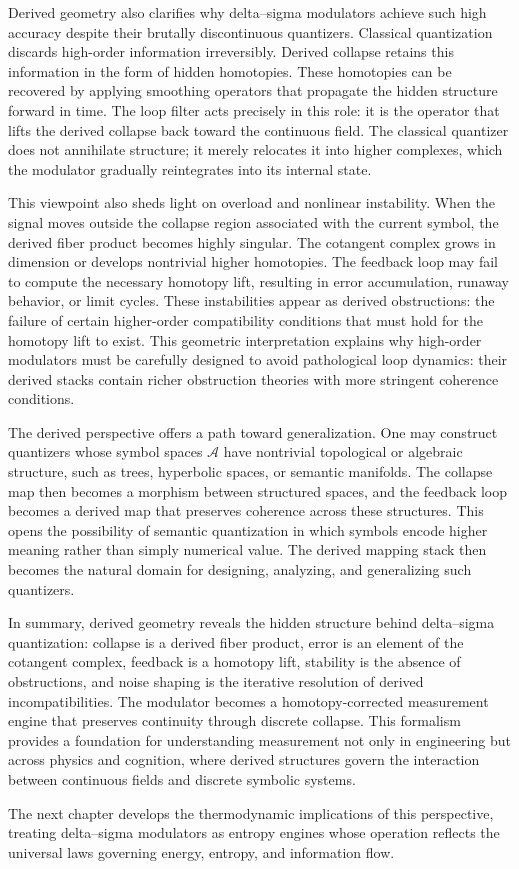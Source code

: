 Derived geometry also clarifies why delta–sigma modulators achieve such high accuracy despite their brutally discontinuous quantizers. Classical quantization discards high-order information irreversibly. Derived collapse retains this information in the form of hidden homotopies. These homotopies can be recovered by applying smoothing operators that propagate the hidden structure forward in time. The loop filter acts precisely in this role: it is the operator that lifts the derived collapse back toward the continuous field. The classical quantizer does not annihilate structure; it merely relocates it into higher complexes, which the modulator gradually reintegrates into its internal state.

This viewpoint also sheds light on overload and nonlinear instability. When the signal moves outside the collapse region associated with the current symbol, the derived fiber product becomes highly singular. The cotangent complex grows in dimension or develops nontrivial higher homotopies. The feedback loop may fail to compute the necessary homotopy lift, resulting in error accumulation, runaway behavior, or limit cycles. These instabilities appear as derived obstructions: the failure of certain higher-order compatibility conditions that must hold for the homotopy lift to exist. This geometric interpretation explains why high-order modulators must be carefully designed to avoid pathological loop dynamics: their derived stacks contain richer obstruction theories with more stringent coherence conditions.

The derived perspective offers a path toward generalization. One may construct quantizers whose symbol spaces \(\mathcal{A}\) have nontrivial topological or algebraic structure, such as trees, hyperbolic spaces, or semantic manifolds. The collapse map then becomes a morphism between structured spaces, and the feedback loop becomes a derived map that preserves coherence across these structures. This opens the possibility of semantic quantization in which symbols encode higher meaning rather than simply numerical value. The derived mapping stack then becomes the natural domain for designing, analyzing, and generalizing such quantizers.

In summary, derived geometry reveals the hidden structure behind delta–sigma quantization: collapse is a derived fiber product, error is an element of the cotangent complex, feedback is a homotopy lift, stability is the absence of obstructions, and noise shaping is the iterative resolution of derived incompatibilities. The modulator becomes a homotopy-corrected measurement engine that preserves continuity through discrete collapse. This formalism provides a foundation for understanding measurement not only in engineering but across physics and cognition, where derived structures govern the interaction between continuous fields and discrete symbolic systems.

The next chapter develops the thermodynamic implications of this perspective, treating delta–sigma modulators as entropy engines whose operation reflects the universal laws governing energy, entropy, and information flow.


